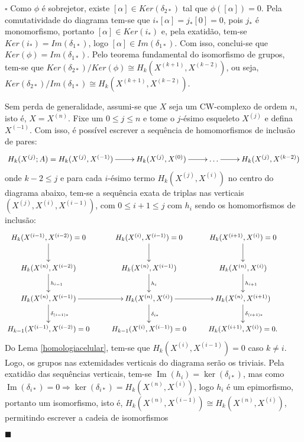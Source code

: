 \documentclass[12pt]{book}
\newenvironment{prova}[1]{$\square$ #1}{\hfill$\blacksquare$}
\DeclareMathOperator{\Ima}{Im}
\newcommand{\classe}[1]{[#1]}
\newcommand{\homologia}[2]{H_{#1}(#2;A)}
\newcommand{\homologiarel}[3]{H_{#1}(#2,#3)}
\newcommand{\homologiarelskele}[3]{H_{#1}(X^{(#2)}, X^{(#3)})}
\newcommand{\imagem}[1]{\Ima(#1)}
\newcommand{\skeleton}[1]{X^{(#1)}}
\begin{document}
\begin{prova}
		Como $\phi$ é sobrejetor, existe $\classe{\alpha} \in Ker(\delta_{2*})$ tal que $\phi(\classe{\alpha}) = 0$. Pela comutatividade do diagrama tem-se que $i_{*}{\classe{\alpha}} = j_{*}\classe{0} = 0$, pois $j_{*}$ é monomorfismo, portanto $\classe{\alpha} \in Ker(i_{*})$ e, pela exatidão, tem-se $Ker(i_{*})=Im(\delta_{1*})$, logo $\classe{\alpha} \in Im(\delta_{1*})$. Com isso, conclui-se que $Ker(\phi) = Im(\delta_{1*})$. Pelo teorema fundamental do isomorfismo de grupos, tem-se que $Ker(\delta_{2*})/Ker(\phi) \cong \homologiarelskele{k}{k+1}{k-2}$, ou seja, $Ker(\delta_{2*})/Im(\delta_{1*}) \cong \homologiarelskele{k}{k+1}{k-2}$.
		
		Sem perda de generalidade, assumi-se que $X$ seja um CW-complexo de ordem $n$, isto é, $X= \skeleton{n}$. Fixe um $0 \leq j \leq n$ e tome o $j$-ésimo esqueleto $\skeleton{j}$ e defina $\skeleton{-1}$. Com isso, é possível escrever a sequência de homomorfismos de inclusão de pares:
		$$
		\xymatrix{
			\homologia{k}{\skeleton{j}} = \homologiarel{k}{\skeleton{j}}{\skeleton{-1}}\ar[r]& \homologiarel{k}{\skeleton{j}}{\skeleton{0}} \ar[r] & \dots \ar[r] & \homologiarel{k}{\skeleton{j}}{\skeleton{k-2}}
		}
		$$
		onde $k-2 \leq j$ e para cada $i$-ésimo termo $\homologiarelskele{k}{j}{i}$ no centro do diagrama abaixo, tem-se a sequência exata de triplas nas verticais $(\skeleton{j}, \skeleton{i}, \skeleton{i-1})$, com $0\leq i +1\leq j$ com $h_{i}$ sendo os homomorfismos de inclusão:
		$$
		\xymatrix{
			\homologiarel{k}{\skeleton{i-1}}{\skeleton{i-2}}=0 \ar[d] & \homologiarel{k}{\skeleton{i}}{\skeleton{i-1}}=0 \ar[d] & \homologiarel{k}{\skeleton{i+1}}{\skeleton{i}}=0 \ar[d] &	
			\\
			\homologiarel{k}{\skeleton{n}}{\skeleton{i-2}} \ar[d]^{h_{i-1}} & \homologiarel{k}{\skeleton{n}}{\skeleton{i-1}} \ar[d]^{h_{i}} & \homologiarel{k}{\skeleton{n}}{\skeleton{i}} \ar[d]^{h_{i+1}}
			\\
			\homologiarel{k}{\skeleton{n}}{\skeleton{i-1}} \ar[r]\ar[d]^{\delta_{(i-1)*}}& \homologiarel{k}{\skeleton{n}}{\skeleton{i}} \ar[r] \ar[d]^{\delta_{i*}} &  \homologiarel{k}{\skeleton{n}}{\skeleton{i+1}} \ar[d]^{\delta_{(i+1)*}} 
			\\
			\homologiarelskele{k-1}{i-1}{i-2}=0& \homologiarel{k-1}{\skeleton{i}}{\skeleton{i-1}}=0 &  \homologiarel{k}{\skeleton{i+1}}{\skeleton{i}}=0. &		
		}
		$$
		Do Lema \ref{homologiacelular}, tem-se que $\homologiarelskele{k}{i}{i-1} =0$ caso $k \neq i$. Logo, os grupos nas extemidades verticais do diagrama serão os triviais. Pela exatidão das sequências verticais, tem-se $\imagem{h_{i}}= \ker(\delta_{i*})$, mas como $\imagem{\delta_{i*}} = 0 \Rightarrow \ker(\delta_{i*}) = \homologiarel{k}{\skeleton{n}}{\skeleton{i}}$, logo $h_{i}$ é um epimorfismo, portanto um isomorfismo, isto é, $\homologiarel{k}{\skeleton{n}}{\skeleton{i-1}} \cong \homologiarel{k}{\skeleton{n}}{\skeleton{i}}$, permitindo escrever a cadeia de isomorfismos 

\end{prova}
\end{document}
